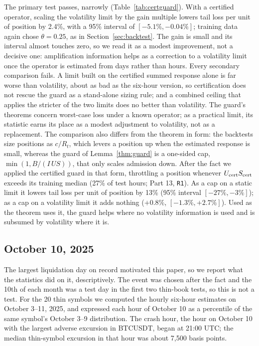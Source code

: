 \documentclass[12pt]{article}
\theoremstyle{definition}
\theoremstyle{remark}
\begin{document}
The primary test passes, narrowly (Table~\ref{tab:certguard}). With a certified operator, scaling the volatility limit by the gain multiple lowers tail loss per unit of position by 2.4\%, with a 95\% interval of $[-5.1\%,-0.04\%]$; training data again chose $\theta=0.25$, as in Section~\ref{sec:backtest}. The gain is small and its interval almost touches zero, so we read it as a modest improvement, not a decisive one: amplification information helps as a correction to a volatility limit once the operator is estimated from days rather than hours. Every secondary comparison fails. A limit built on the certified summed response alone is far worse than volatility, about as bad as the six-hour version, so certification does not rescue the guard as a stand-alone sizing rule; and a combined ceiling that applies the stricter of the two limits does no better than volatility. The guard's theorems concern worst-case loss under a known operator; as a practical limit, its statistic earns its place as a modest adjustment to volatility, not as a replacement. The comparison also differs from the theorem in form: the backtests size positions as $c/R_t$, which levers a position up when the estimated response is small, whereas the guard of Lemma~\ref{thm:guard} is a one-sided cap, $\min(1,B/(I\,U S))$, that only scales admission down. After the fact we applied the certified guard in that form, throttling a position whenever $U_{\rm cert}S_{\rm cert}$ exceeds its training median (27\% of test hours; Part 13, \texttt{R1}). As a cap on a static limit it lowers tail loss per unit of position by 13\% (95\% interval $[-27\%,-3\%]$); as a cap on a volatility limit it adds nothing ($+0.8\%$, $[-1.3\%,+2.7\%]$). Used as the theorem uses it, the guard helps where no volatility information is used and is subsumed by volatility where it is.

\subsection{October 10, 2025}\label{sec:oct10}
The largest liquidation day on record motivated this paper, so we report what the statistics did on it, descriptively. The event was chosen after the fact and the 10th of each month was a test day in the first two thin-book tests, so this is not a test. For the 20 thin symbols we computed the hourly six-hour estimates on October 3--11, 2025, and expressed each hour of October 10 as a percentile of the same symbol's October 3--9 distribution. The crash hour, the hour on October 10 with the largest adverse excursion in BTCUSDT, began at 21:00 UTC; the median thin-symbol excursion in that hour was about 7{,}500 basis points.
\end{document}
